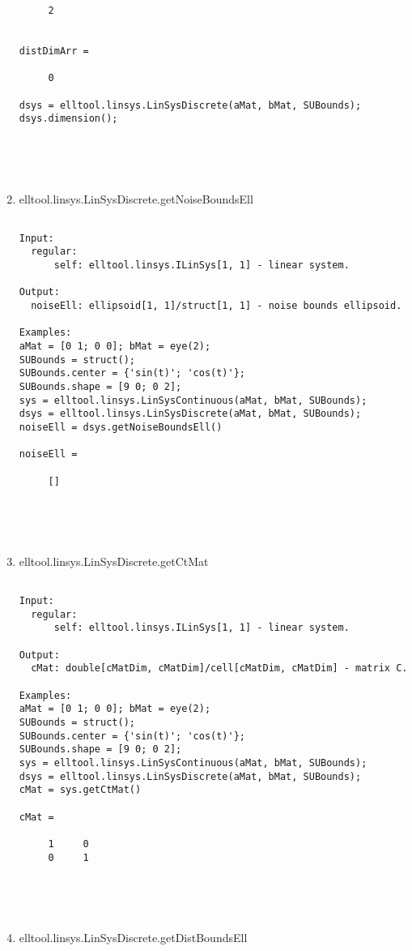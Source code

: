\begin{enumerate}
\begin{lstlisting}
     2


distDimArr =

     0

dsys = elltool.linsys.LinSysDiscrete(aMat, bMat, SUBounds);
dsys.dimension();





\end{lstlisting}
\fontfamily{\familydefault}
\selectfont
\item {elltool.linsys.LinSysDiscrete.getNoiseBoundsEll}
\selectfont
\begin{lstlisting}

Input:
  regular:
      self: elltool.linsys.ILinSys[1, 1] - linear system.

Output:
  noiseEll: ellipsoid[1, 1]/struct[1, 1] - noise bounds ellipsoid.

Examples:
aMat = [0 1; 0 0]; bMat = eye(2);
SUBounds = struct();
SUBounds.center = {'sin(t)'; 'cos(t)'};
SUBounds.shape = [9 0; 0 2];
sys = elltool.linsys.LinSysContinuous(aMat, bMat, SUBounds);
dsys = elltool.linsys.LinSysDiscrete(aMat, bMat, SUBounds);
noiseEll = dsys.getNoiseBoundsEll()

noiseEll =

     []





\end{lstlisting}
\fontfamily{\familydefault}
\selectfont
\item {elltool.linsys.LinSysDiscrete.getCtMat}
\selectfont
\begin{lstlisting}

Input:
  regular:
      self: elltool.linsys.ILinSys[1, 1] - linear system.

Output:
  cMat: double[cMatDim, cMatDim]/cell[cMatDim, cMatDim] - matrix C.

Examples:
aMat = [0 1; 0 0]; bMat = eye(2);
SUBounds = struct();
SUBounds.center = {'sin(t)'; 'cos(t)'};
SUBounds.shape = [9 0; 0 2];
sys = elltool.linsys.LinSysContinuous(aMat, bMat, SUBounds);
dsys = elltool.linsys.LinSysDiscrete(aMat, bMat, SUBounds);
cMat = sys.getCtMat()

cMat =

     1     0
     0     1





\end{lstlisting}
\fontfamily{\familydefault}
\selectfont
\item {elltool.linsys.LinSysDiscrete.getDistBoundsEll}
\selectfont
\begin{lstlisting}


\end{lstlisting}
\end{enumerate}
